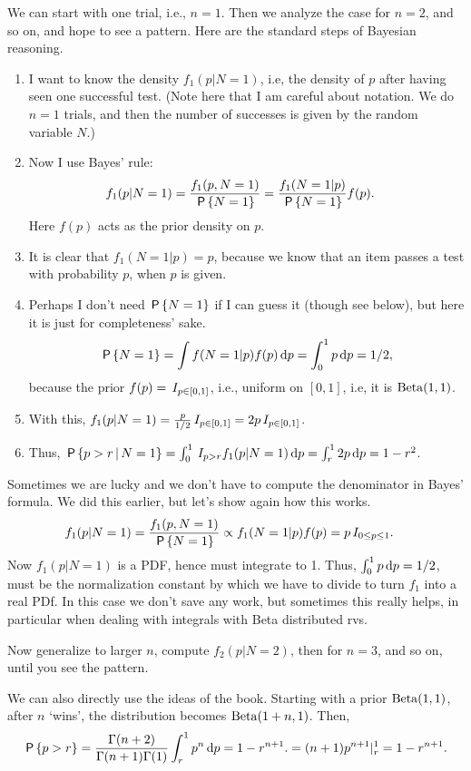 \begin{exercise}
\begin{solution}
We can start with one trial, i.e., $n=1$. Then we analyze the case for $n=2$, and so on, and hope to see a pattern.  Here are the standard steps of Bayesian reasoning.
\begin{enumerate}
\item I want to know the density $f_1(p | N= 1)$, i.e, the density of $p$ after having seen one  successful test.  (Note here that I am careful about notation. We do $n=1$ trials, and then the number of successes is given by the random variable $N$.)
\item Now I use Bayes' rule:
   \begin{align*}
    f_1(p| N=1) &= \frac{f_1(p, N=1)}{\P{N=1}} = \frac{f_1( N=1| p)}{\P{N=1}} f(p).
   \end{align*}
   Here $f(p)$ acts as the prior density on $p$.
\item It is clear that $f_1(N=1|p) = p$, because  we know that  an item passes a test with probability $p$, when $p$ is given.
\item Perhaps I don't need $\P{N=1}$ if I can guess it (though see below), but here it is just for completeness' sake.
   \begin{align*}
   \P{N=1} = \int f(N=1|p) f(p) \d p = \int_0^{1} p \d p = 1/2,
   \end{align*}
   because the prior $f(p) = \1{p\in [0,1]}$, i.e., uniform on $[0,1]$, i.e, it is $\Beta{1,1}$.
\item With this, $f_1(p|N=1) = \frac{p}{1/2} \1{p\in[0,1]} = 2p  \1{p\in[0,1]}$.
\item Thus, $\P{p>r\given N=1} = \int_{0}^1 \1{p>r} f_1(p |N=1)\d p = \int_{r}^1 2p\d p = 1-r^2$.
\end{enumerate}
Sometimes we are lucky and we don't have to compute the denominator in Bayes' formula. We did this earlier, but let's show again how this works.
   \begin{align*}
    f_1(p| N=1) &= \frac{f_1(p, N=1)}{\P{N=1}} \propto f_1( N=1| p)f(p) = p \1{0\leq p \leq 1}.
   \end{align*}
Now $f_1(p| N=1)$ is a PDF, hence must integrate to 1. Thus, $\int_{0}^{1} p \d p = 1/2$, must be the normalization constant by which we have to divide to turn $f_1$ into a real PDf. In this case we don't save any work, but sometimes this really helps, in particular when dealing with integrals with Beta distributed rvs.

Now generalize to larger $n$, compute $f_2(p|N=2)$, then for $n=3$, and so on, until you see the pattern.

We can also directly use the ideas of the book. Starting with a prior $\Beta{1,1}$, after $n$ `wins', the distribution becomes $\Beta{1+n, 1}$.  Then,
\begin{align*}
  \P{p>r} = \frac{\Gamma(n+2)}{\Gamma(n+1)\Gamma(1)}\int_r^1 p^n \d p = 1-r^{n+1}.
   = (n+1) p^{n+1}|_r^{1} = 1-r^{n+1}.
\end{align*}

\end{solution}
\end{exercise}


